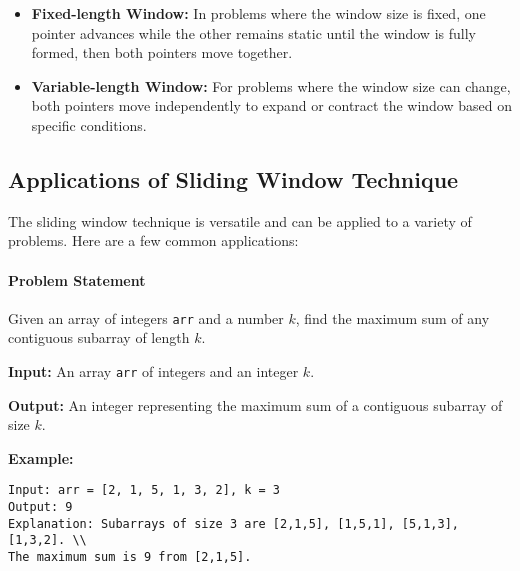 \begin{itemize}
    \item \textbf{Fixed-length Window:} In problems where the window size is fixed, one pointer advances while the other remains static until the window is fully formed, then both pointers move together.
    \item \textbf{Variable-length Window:} For problems where the window size can change, both pointers move independently to expand or contract the window based on specific conditions.
\end{itemize}



\subsection*{Applications of Sliding Window Technique}

The sliding window technique is versatile and can be applied to a variety of problems. Here are a few common applications:


\paragraph*{Problem Statement}

Given an array of integers \texttt{arr} and a number \(k\), find the maximum sum of any contiguous subarray of length \(k\).

\textbf{Input:} An array \texttt{arr} of integers and an integer \(k\).

\textbf{Output:} An integer representing the maximum sum of a contiguous subarray of size \(k\).

\textbf{Example:}
\begin{verbatim}
Input: arr = [2, 1, 5, 1, 3, 2], k = 3
Output: 9
Explanation: Subarrays of size 3 are [2,1,5], [1,5,1], [5,1,3], [1,3,2]. \\
The maximum sum is 9 from [2,1,5].
\end{verbatim}

